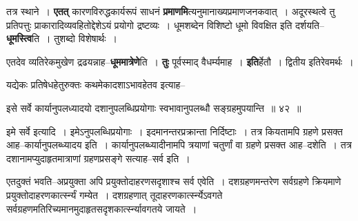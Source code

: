 \documentclass[article,12pt,a4paper]{memoir}
\begin{document}
	  \pstart तत्र स्थाने । \textbf{एतत्} कारणविरुद्धकार्यरूपं साधनं \textbf{प्रमाणमि}त्यनुमानाख्यप्रमाणजनकवात् । अदूरस्थत्वे तु प्रतिपत्तुः प्राकारादिव्यवहितोद्देशेऽयं प्रयोगो द्रष्टव्यः । धूमशब्देन विशिष्टो धूमो विवक्षित इति दर्शयति--\textbf{धूमस्त्वि}ति । तुशब्दो विशेषार्थः ।
	\pend
      

	  \pstart एतदेव व्यतिरेकमुखेण द्रढयन्नाह--\textbf{धूममात्रेणे}ति । \textbf{तुः} पूर्वस्माद् वैधर्म्यमाह । \textbf{इति}र्हेतौ । द्वितीय इतिरेवमर्थः ।
	\pend
	  \bigskip
	  \begingroup
	

	  \pstart यद्येकः प्रतिषेधहेतुरुक्तः कथमेकादशाऽभावहेतव इत्याह--
	\pend
        
	  \bigskip
	  \begingroup
	

	  \pstart इसे सर्वे कार्यानुपलध्यादयो दशानुपलब्धिप्रयोगाः स्वभावानुपलब्धौ सङ्ग्रहमुपयान्ति ॥ ४२ ॥
	\pend
      
	  \endgroup
	 

	  \pstart {}इमे सर्वे इत्यादि । इमेऽनुपलब्धिप्रयोगाः । इदमानन्तरप्रक्रान्ता निर्दिष्टाः । तत्र कियतामपि ग्रहणे प्रसक्त आह--कार्यानुपलब्ध्यादय इति । कार्यानुपलब्ध्यादीनामपि त्रयाणां चतुर्णां वा ग्रहणे प्रसक्त आह--दशेति । तत्र दशानामप्युदाहृतमात्राणां ग्रहणप्रसङ्गे सत्याह--सर्व इति ।
	\pend
        

	  \pstart एतदुक्तं भवति--अप्रयुक्ता अपि प्रयुक्तोदाहरणसदृशाश्च सर्व एवेति । दशग्रहणमन्तरेण सर्वग्रहणे क्रियमाणे प्रयुक्तोदाहरणकार्त्स्न्यं गम्येत । दशग्रहणात् तूदाहरणकार्त्स्न्येऽवगते सर्वग्रहणमतिरिच्यमानमुदाहृतसदृशकार्त्स्न्यावगतये जायते ।
	\pend
      
\end{document}
